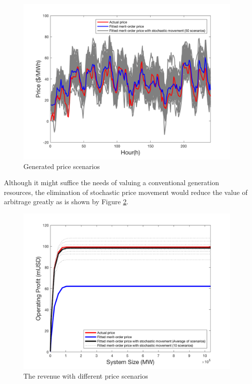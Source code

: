\begin{figure}[h!]
	\centering
	\includegraphics[width=0.95\linewidth]{Figures/5_Example-simulated_price}
	\caption{Generated price scenarios}
	\label{fig:price-example}
\end{figure}

Although it might suffice the needs of valuing a conventional generation resources, the elimination of stochastic price movement would reduce the value of arbitrage greatly as is shown by Figure \ref{fig:model-validation}.

\begin{figure}[h!]
	\centering
	\includegraphics[width=0.95\linewidth]{Figures/6_Model_Validation}
	\caption{The revenue with different price scenarios}
	\label{fig:model-validation}
\end{figure}

